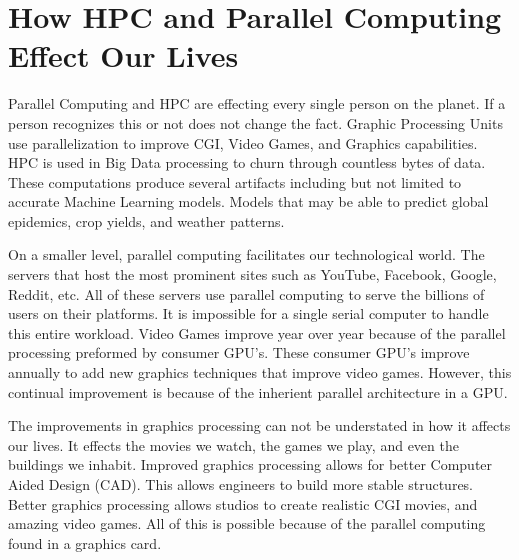 \setlength{\parindent}{10ex}


\section{How HPC and Parallel Computing Effect Our Lives}
Parallel Computing and HPC are effecting every single person on the planet.
If a person recognizes this or not does not change the fact. 
Graphic Processing Units use parallelization to improve CGI, Video Games, and Graphics capabilities.
HPC is used in Big Data processing to churn through countless bytes of data.
These computations produce several artifacts including but not limited to accurate Machine Learning models.
Models that may be able to predict global epidemics, crop yields, and weather patterns.

\par
On a smaller level, parallel computing facilitates our technological world. 
The servers that host the most prominent sites such as YouTube, Facebook, Google, Reddit, etc.
All of these servers use parallel computing to serve the billions of users on their platforms.
It is impossible for a single serial computer to handle this entire workload. 
Video Games improve year over year because of the parallel processing preformed by consumer GPU's.
These consumer GPU's improve annually to add new graphics techniques that improve video games.
However, this continual improvement is because of the inherient parallel architecture in a GPU.

\par
The improvements in graphics processing can not be understated in how it affects our lives.
It effects the movies we watch, the games we play, and even the buildings we inhabit.
Improved graphics processing allows for better Computer Aided Design (CAD).
This allows engineers to build more stable structures.
Better graphics processing allows studios to create realistic CGI movies, and amazing video games.
All of this is possible because of the parallel computing found in a graphics card.

